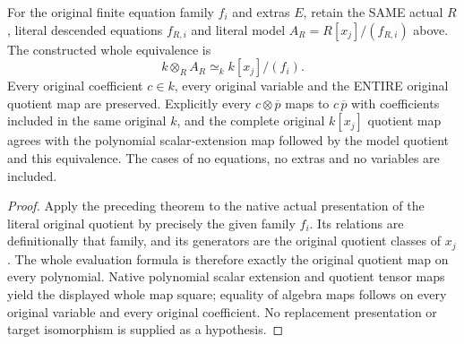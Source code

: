 \begin{theorem}
\label{thm:arithmetic-literal-polynomial-quotient-model}
\leanok
{}
For the original finite equation family $f_i$ and extras $E$, retain the
SAME actual $R$, literal descended equations $f_{R,i}$ and literal model
$A_R=R[x_j]/(f_{R,i})$ above. The constructed whole equivalence is
\[ k\otimes_R A_R\simeq_k k[x_j]/(f_i). \]
Every original coefficient $c\in k$, every original variable and the ENTIRE
original quotient map are preserved. Explicitly every $c\otimes\overline p$
maps to $c\,\overline{p}$ with coefficients included in the same original
$k$, and the complete original $k[x_j]$ quotient map agrees with the
polynomial scalar-extension map followed by the model quotient and this
equivalence. The cases of no equations, no extras and no variables are included.
\end{theorem}
\begin{proof}
Apply the preceding theorem to the native actual presentation of the
literal original quotient by precisely the given family $f_i$. Its relations
are definitionally that family, and its generators are the original
quotient classes of $x_j$. The whole evaluation formula is therefore exactly
the original quotient map on every polynomial. Native polynomial scalar
extension and quotient tensor maps yield the displayed whole map square;
equality of algebra maps follows on every original variable and every
original coefficient. No replacement presentation or target isomorphism
is supplied as a hypothesis.
\end{proof}

